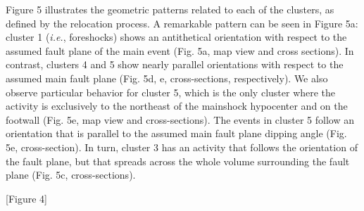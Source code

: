 \documentclass[a4paper,12pt,twoside]{article}
\begin{document}
Figure 5 illustrates the geometric patterns related to each of the clusters, as defined by the relocation process. A remarkable pattern can be seen in Figure 5a: cluster 1 (\emph{i.e.}, foreshocks) shows an antithetical orientation with respect to the assumed fault plane of the main event (Fig. 5a, map view and cross sections). In contrast, clusters 4 and 5 show nearly parallel orientations with respect to the assumed main fault plane (Fig. 5d, e, cross-sections, respectively). We also observe particular behavior for cluster 5, which is the only cluster where the activity is exclusively to the northeast of the mainshock hypocenter and on the footwall (Fig. 5e, map view and cross-sections). The events in cluster 5 follow an orientation that is parallel to the assumed main fault plane dipping angle (Fig. 5e, cross-section). In turn, cluster 3 has an activity that follows the orientation of the fault plane, but that spreads across the whole volume surrounding the fault plane (Fig. 5c, cross-sections).

\begin{center}
   [Figure 4]
\end{center}
\end{document}

